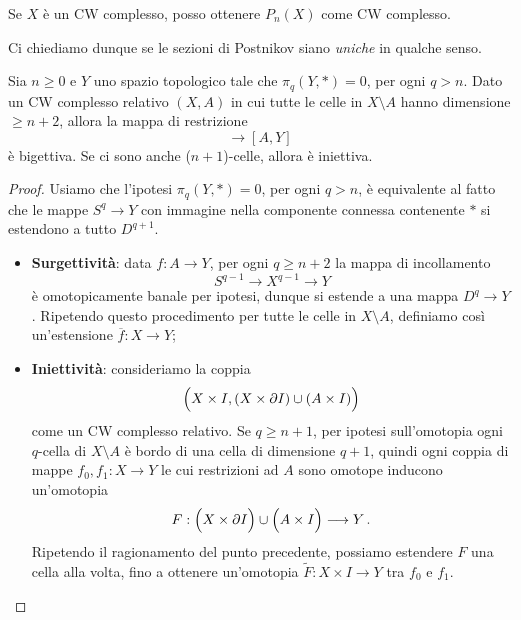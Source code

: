 \begin{oss}
	Se $X$ è un CW complesso, 
	posso ottenere $P_{n}(X)$ come CW complesso.
\end{oss}

Ci chiediamo dunque se le sezioni di Postnikov siano \emph{uniche}
in qualche senso.
\begin{prop}\label{CW-est}
	Sia $n \ge 0$ e $Y$ uno spazio topologico tale che $\pi_{q}(Y, \ast)=0$,
	per ogni $q>n$. Dato un CW complesso relativo $(X,A)$ in cui
	tutte le celle in $X \setminus A$ hanno dimensione $\ge n+2$,
	allora la mappa di restrizione
	\begin{equation*}
		[X,Y] \longrightarrow [A,Y]
	\end{equation*}
	è bigettiva. Se ci sono anche ($n+1$)-celle,
	allora è iniettiva.
	\begin{proof}
		Usiamo che l'ipotesi $\pi_{q}(Y,\ast)=0$, per ogni $q > n$,
		è equivalente al fatto che	
		le mappe $S^{q} \to Y$ con immagine nella componente
		connessa contenente $\ast$ si estendono a tutto $D^{q+1}$.
		\begin{itemize}
			\item \textbf{Surgettività}: data $f:A \to Y$,
			per ogni $q \ge n+2$ la mappa di incollamento
			\begin{equation*}
				S^{q-1} \longrightarrow X^{q-1} \longrightarrow Y
			\end{equation*}
			è omotopicamente banale per ipotesi,
			dunque si estende a una mappa $D^{q} \to Y$.
			Ripetendo questo procedimento per tutte
			le celle in $X \setminus A$, definiamo così
			un'estensione $\overline{f}:X \to Y$;
			
			\item \textbf{Iniettività}:
			consideriamo la coppia
			\begin{equation*}
				\Big(X \times I, (X \times \partial I) \cup (A \times I) \Big)
			\end{equation*}
			come un CW complesso relativo.
			Se $q \ge n+1$, per ipotesi sull'omotopia ogni $q$-cella di $X \setminus A$
			è bordo di una cella di dimensione $q+1$,
			quindi ogni coppia di mappe $f_{0},f_{1}:X \to Y$ 
			le cui restrizioni ad $A$ sono omotope inducono un'omotopia
			\begin{equation*}
				F : \Big( X \times \partial I \Big) \cup \Big( A \times I \Big)
				\longrightarrow Y\,.
			\end{equation*}
			Ripetendo il ragionamento del punto precedente,
			possiamo estendere $F$ una cella alla volta,
			fino a ottenere un'omotopia $\widetilde{F}:X \times I \to Y$
			tra $f_{0}$ e $f_{1}$.
		\end{itemize}
	\end{proof}
\end{prop}

